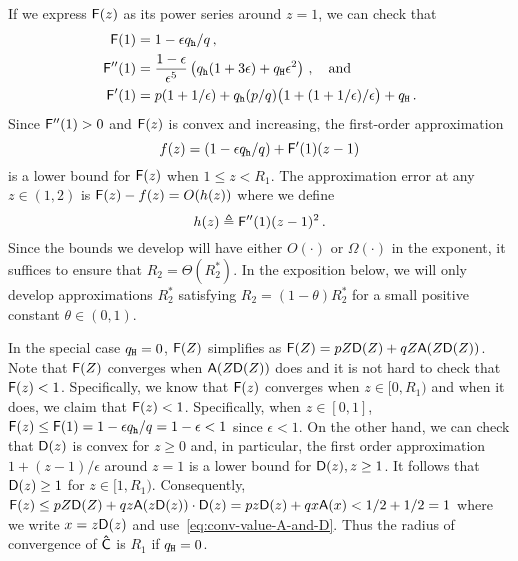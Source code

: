   If we express $\mathsf{F}(z)$ as its power series around $z = 1$, we can check that 
  \begin{align*}
    \mathsf{F}(1) &= 1 - \epsilon q_{\mathtt{h}}/q\,,\\
    \mathsf{F}''(1) &= 
      \frac{1-\epsilon}{\epsilon^5}\left( q_{\mathtt{h}} (1+3\epsilon) + q_{\mathtt{H}} \epsilon^2 \right)\,, \quad\text{and}\\
    \mathsf{F}'(1) &= p(1+1/\epsilon) + q_{\mathtt{h}}(p/q)\bigl( 1+(1+1/\epsilon)/\epsilon \bigr) + q_{\mathtt{H}}
    \,.
  \end{align*}
  Since $\mathsf{F}''(1) > 0$ and $\mathsf{F}(z)$ is convex and increasing, 
  the first-order approximation 
  \begin{equation}
    f(z) = (1 - \epsilon q_{\mathtt{h}}/q) + \mathsf{F}'(1)(z-1) 
  \end{equation}
  is a lower bound for $\mathsf{F}(z)$ when $1 \leq z < R_1$. 
  The approximation error at any $z \in (1, 2)$ is 
  $\mathsf{F}(z) - f(z) = O(h(z))$ 
  where we define $$h(z) \triangleq \mathsf{F}''(1) (z-1)^2\,.$$
  Since the bounds we develop will have 
  either $O(\cdot)$ or $\Omega(\cdot)$ in the exponent, 
  it suffices to ensure that $R_2 = \Theta(R_2^*)$.
  In the exposition below, 
  we will only develop approximations $R_2^*$ satisfying 
  $R_2 = (1 - \theta) R_2^*$ 
  for a small positive constant $\theta \in (0, 1)$. 

  In the special case $q_{\mathtt{H}} = 0$, 
  $\mathsf{F}(Z)$ simplifies as $\mathsf{F}(Z) = pZ \mathsf{D}(Z) + q  Z \mathsf{A}(Z \mathsf{D}(Z) )$. 
  Note that $\mathsf{F}(Z)$ converges when $\mathsf{A}(Z \mathsf{D}(Z) )$ does 
  and it is not hard to check that $\mathsf{F}(z) < 1$. 
  Specifically, 
  we know that $\mathsf{F}(z)$ converges when $z \in[0, R_1)$ 
  and when it does, we claim that $\mathsf{F}(z) < 1$. 
  Specifically, when $z \in [0, 1]$, 
  $\mathsf{F}(z) \leq \mathsf{F}(1) = 1 - \epsilon q_{\mathtt{h}}/q = 1 - \epsilon < 1$ since $\epsilon < 1$. 
  On the other hand, 
  we can check that $\mathsf{D}(z)$ is convex for $z \geq 0$ and, 
  in particular, the first order approximation $1 + (z-1)/\epsilon$ around $z = 1$ 
  is a lower bound for $\mathsf{D}(z), z \geq 1$.
  It follows that $\mathsf{D}(z) \geq 1$ for $z \in [1, R_1)$. 
  Consequently, 
  $\mathsf{F}(z) 
  \leq pZ \mathsf{D}(Z) + q  z \mathsf{A}(z \mathsf{D}(z) )\cdot \mathsf{D}(z) 
  = pz \mathsf{D}(z) + q  x \mathsf{A}(x) 
  < 1/2 + 1/2 = 1$ 
  where we write $x = z \mathsf{D}(z)$ and use~\eqref{eq:conv-value-A-and-D}. 
  Thus 
  the radius of convergence of $\mathsf{\hat{C}}$ is $R_1$ if $q_{\mathtt{H}} = 0$.

